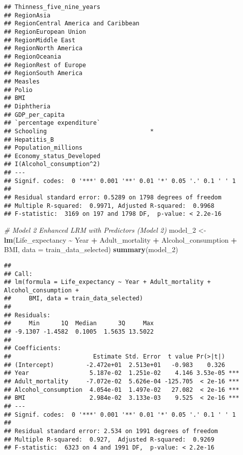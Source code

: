 \documentclass[
]{article}
\newenvironment{Shaded}{\begin{snugshade}}{\end{snugshade}}
\newcommand{\AttributeTok}[1]{\textcolor[rgb]{0.13,0.29,0.53}{#1}}
\newcommand{\CommentTok}[1]{\textcolor[rgb]{0.56,0.35,0.01}{\textit{#1}}}
\newcommand{\FunctionTok}[1]{\textcolor[rgb]{0.13,0.29,0.53}{\textbf{#1}}}
\newcommand{\NormalTok}[1]{#1}
\newcommand{\OtherTok}[1]{\textcolor[rgb]{0.56,0.35,0.01}{#1}}
\newcommand{\SpecialCharTok}[1]{\textcolor[rgb]{0.81,0.36,0.00}{\textbf{#1}}}
\begin{document}
\begin{verbatim}
## Thinness_five_nine_years                 
## RegionAsia                               
## RegionCentral America and Caribbean      
## RegionEuropean Union                     
## RegionMiddle East                        
## RegionNorth America                      
## RegionOceania                            
## RegionRest of Europe                     
## RegionSouth America                      
## Measles                                  
## Polio                                    
## BMI                                      
## Diphtheria                               
## GDP_per_capita                           
## `percentage expenditure`                 
## Schooling                             *  
## Hepatitis_B                              
## Population_millions                      
## Economy_status_Developed                 
## I(Alcohol_consumption^2)                 
## ---
## Signif. codes:  0 '***' 0.001 '**' 0.01 '*' 0.05 '.' 0.1 ' ' 1
## 
## Residual standard error: 0.5289 on 1798 degrees of freedom
## Multiple R-squared:  0.9971, Adjusted R-squared:  0.9968 
## F-statistic:  3169 on 197 and 1798 DF,  p-value: < 2.2e-16
\end{verbatim}

\begin{Shaded}
\begin{Highlighting}[]
\CommentTok{\#  Model 2 Enhanced LRM with Predictors (Model 2)}
\NormalTok{model\_2 }\OtherTok{\textless{}{-}} \FunctionTok{lm}\NormalTok{(Life\_expectancy }\SpecialCharTok{\textasciitilde{}}\NormalTok{ Year }\SpecialCharTok{+}\NormalTok{ Adult\_mortality }\SpecialCharTok{+}\NormalTok{ Alcohol\_consumption }\SpecialCharTok{+}\NormalTok{ BMI, }\AttributeTok{data =}\NormalTok{ train\_data\_selected)}
\FunctionTok{summary}\NormalTok{(model\_2)}
\end{Highlighting}
\end{Shaded}

\begin{verbatim}
## 
## Call:
## lm(formula = Life_expectancy ~ Year + Adult_mortality + Alcohol_consumption + 
##     BMI, data = train_data_selected)
## 
## Residuals:
##     Min      1Q  Median      3Q     Max 
## -9.1307 -1.4582  0.1005  1.5635 13.5022 
## 
## Coefficients:
##                       Estimate Std. Error  t value Pr(>|t|)    
## (Intercept)         -2.472e+01  2.513e+01   -0.983    0.326    
## Year                 5.187e-02  1.251e-02    4.146 3.53e-05 ***
## Adult_mortality     -7.072e-02  5.626e-04 -125.705  < 2e-16 ***
## Alcohol_consumption  4.054e-01  1.497e-02   27.082  < 2e-16 ***
## BMI                  2.984e-02  3.133e-03    9.525  < 2e-16 ***
## ---
## Signif. codes:  0 '***' 0.001 '**' 0.01 '*' 0.05 '.' 0.1 ' ' 1
## 
## Residual standard error: 2.534 on 1991 degrees of freedom
## Multiple R-squared:  0.927,  Adjusted R-squared:  0.9269 
## F-statistic:  6323 on 4 and 1991 DF,  p-value: < 2.2e-16
\end{verbatim}
\end{document}
